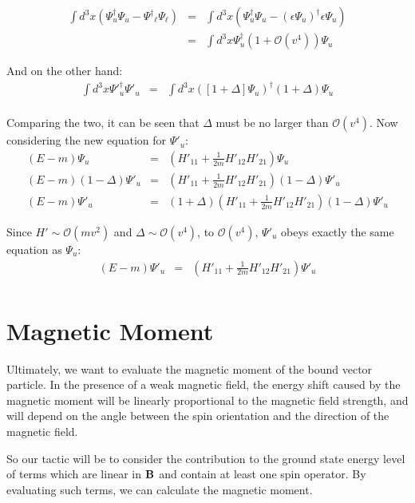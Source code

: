 \begin{eqnarray*}
\int d^3 x (\Psi_u^\dagger \Psi_u - {\Psi^\dagger}_\ell \Psi_\ell)  
	&=& \int d^3 x (\Psi_u^\dagger \Psi_u - (\epsilon {\Psi_u})^\dagger \epsilon \Psi_u) \\
	&=& \int d^3 x \Psi_u^\dagger (1 + \mathcal{O}(v^4)) \Psi_u
\end{eqnarray*}

And on the other hand:
\begin{eqnarray*}
\int d^3 x {\Psi'}_u^\dagger \Psi'_u 
	&=& \int d^3 x ([1 + \Delta]\Psi_u)^\dagger (1+\Delta)\Psi_u \\
\end{eqnarray*}

Comparing the two, it can be seen that $\Delta$ must be no larger than $\mathcal{O}(v^4)$.  Now considering the new equation for $\Psi'_u$:
\begin{eqnarray*}
(E -m)\Psi_u 	
	&=&	\left(H'_{11} +  \frac{1}{2m}H'_{12} H'_{21} \right) \Psi_u\\
(E-m)(1-\Delta)\Psi'_u 
	&=&	\left(H'_{11} +  \frac{1}{2m}H'_{12} H'_{21} \right) (1-\Delta)\Psi'_u\\
(E-m)\Psi'_u 
	&=&	(1 + \Delta)\left(H'_{11} +  \frac{1}{2m}H'_{12} H'_{21} \right) (1-\Delta)\Psi'_u
\end{eqnarray*}

Since $H' \sim \mathcal{O}(mv^2)$ and $\Delta \sim \mathcal{O}(v^4)$, to $\mathcal{O}(v^4)$, $\Psi'_u$ obeys exactly the same equation as $\Psi_u$:
\begin{eqnarray*}
(E -m)\Psi'_u 	
	&=&  \left ( H'_{11} +  \frac{1}{2m} H'_{12} H'_{21}  \right ) \Psi'_u \\
\end{eqnarray*}



\section{Magnetic Moment}
Ultimately, we want to evaluate the magnetic moment of the bound vector particle.  In the presence of a weak magnetic field, the energy shift caused by the magnetic moment will be linearly proportional to the magnetic field strength, and will depend on the angle between the spin orientation and the direction of the magnetic field.

So our tactic will be to consider the contribution to the ground state energy level of terms which are linear in $\mathbf{B}$ and contain at least one spin operator.  By evaluating such terms, we can calculate the magnetic moment.

